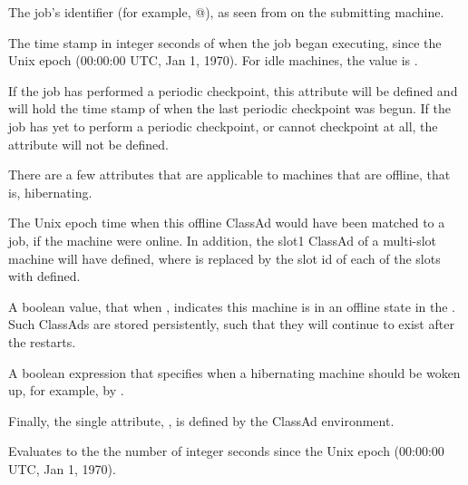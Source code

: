 \begin{description}

\item[\AdAttr{JobId}:] The job's identifier (for example,
@), as seen from 
on the submitting machine.

\item[\AdAttr{JobStart}:] The time stamp in integer seconds of when the job began
executing, since the Unix epoch (00:00:00 UTC, Jan 1, 1970).  For idle
machines, the value is .

\item[\AdAttr{LastPeriodicCheckpoint}:] If the job has performed a
periodic checkpoint, this attribute will be defined and will hold the
time stamp of when the last periodic checkpoint was begun.
If the job has yet to perform a periodic checkpoint, or cannot
checkpoint at all, the  attribute will
not be defined.

\end{description}

There are a few attributes that are applicable to machines that
are offline, that is, hibernating.

\begin{description}

\item[\AdAttr{MachineLastMatchTime}:] The Unix epoch time when this offline 
ClassAd
would have been matched to a job, if the machine were online.  
In addition,
the slot1 ClassAd of a multi-slot machine will have 
 defined,
where  is replaced by the slot id of each of the slots
with  defined.

\item[\AdAttr{Offline}:] A boolean value, that when ,
indicates this machine is in an offline state in the .
Such ClassAds are stored persistently, 
such that they will continue to exist after the  restarts.

\item[\AdAttr{Unhibernate}:] A boolean expression that specifies when
a hibernating machine should be woken up, for example, by .

\end{description}

Finally, the single attribute, 
, is defined by the ClassAd
environment.
\begin{description}
\item[\AdAttr{CurrentTime}:] Evaluates to the 
the number of integer seconds since the Unix epoch (00:00:00 UTC, Jan 1, 1970).
\end{description}
